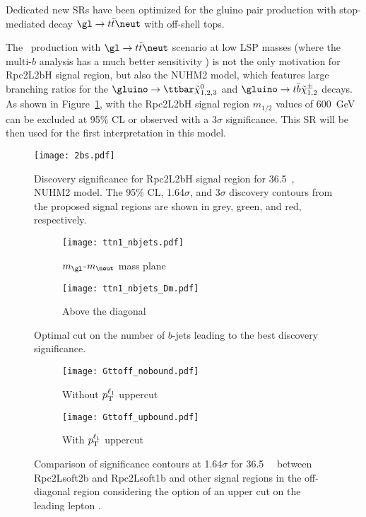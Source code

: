 Dedicated new SRs have been optimized for the gluino pair production with stop-mediated decay $\gl\to t\bar t\neut$ with off-shell tops.

The \glgl\ production with $\gl\to t\bar t\neut$ scenario at low LSP masses (where the multi-$b$ analysis has a much better sensitivity
\cite{ATLAS-CONF-2017-021}) is not the only motivation for Rpc2L2bH signal region, but also the NUHM2 model, which features large branching ratios for the $\gluino\to\ttbar\tilde{\chi}_{1,2,3}^0$ and $\gluino\to t\bar{b}\tilde{\chi}_{1,2}^\pm$ decays. As shown in Figure~\ref{fig:SR_nuhm}, with the Rpc2L2bH signal region $m_{1/2}$ values of 600~GeV can be excluded at 95\% CL or observed with a 3$\sigma$ significance.
This SR will be then used for the first interpretation in this model.

\begin{figure}[t]
\centering
\texttt{[image: 2bs.pdf]}
\caption{Discovery significance for Rpc2L2bH signal region for 36.5~\ifb, NUHM2 model. The 95\% CL, 1.64$\sigma$, and 3$\sigma$ discovery contours from the proposed signal regions are shown in grey, green, and red, respectively.
}
\label{fig:SR_nuhm}
\end{figure}


\begin{figure}
\centering
\begin{subfigure}[t]{0.48\textwidth}
\caption{$m_{\gl}$-$m_{\neut}$ mass plane}
\texttt{[image: ttn1\_nbjets.pdf]}
\end{subfigure}
\begin{subfigure}[t]{0.48\textwidth}
\caption{Above the diagonal}
\texttt{[image: ttn1\_nbjets\_Dm.pdf]}
\end{subfigure}
\caption{Optimal cut on the number of $b$-jets leading to the best discovery significance.
}
\label{fig:SR_Gtt_bjets}
\end{figure}

\begin{figure}
\centering
\begin{subfigure}[t]{0.48\textwidth}
\caption{Without $p_{\rm T}^{\ell_1}$ uppercut}
\texttt{[image: Gttoff\_nobound.pdf]}
\end{subfigure}
\begin{subfigure}[t]{0.48\textwidth}
\caption{With $p_{\rm T}^{\ell_1}$ uppercut}
\texttt{[image: Gttoff\_upbound.pdf]}
\end{subfigure}
\caption{Comparison of significance contours at 1.64$\sigma$ for 36.5~\ifb~ between Rpc2Lsoft2b and Rpc2Lsoft1b and other signal regions in the off-diagonal region considering the option of an upper cut on the leading lepton \pt.}
\label{fig:SR_ptbound}
\end{figure}

